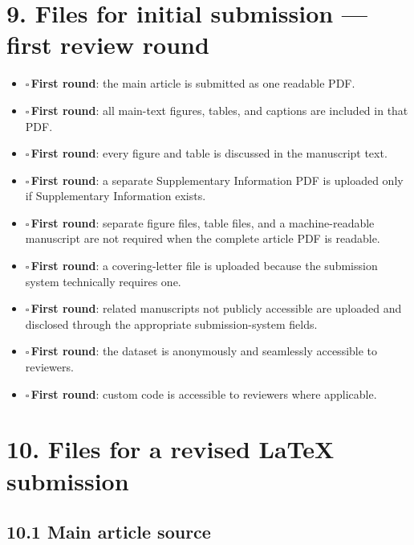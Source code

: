 \documentclass[11pt]{article}
\newcommand{\cbox}{$\square$\,}
\newcommand{\firstround}{\textcolor{teal!70!black}{\textbf{First round}}}
\begin{document}
\section*{9. Files for initial submission --- first review round}

\begin{itemize}
    \item \cbox \firstround: the main article is submitted as one readable PDF.
    \item \cbox \firstround: all main-text figures, tables, and captions are included in that PDF.
    \item \cbox \firstround: every figure and table is discussed in the manuscript text.
    \item \cbox \firstround: a separate Supplementary Information PDF is uploaded only if Supplementary Information exists.
    \item \cbox \firstround: separate figure files, table files, and a machine-readable manuscript are not required when the complete article PDF is readable.
    \item \cbox \firstround: a covering-letter file is uploaded because the submission system technically requires one.
    \item \cbox \firstround: related manuscripts not publicly accessible are uploaded and disclosed through the appropriate submission-system fields.
    \item \cbox \firstround: the dataset is anonymously and seamlessly accessible to reviewers.
    \item \cbox \firstround: custom code is accessible to reviewers where applicable.
\end{itemize}

\section*{10. Files for a revised LaTeX submission}

\subsection*{10.1 Main article source}
\end{document}
